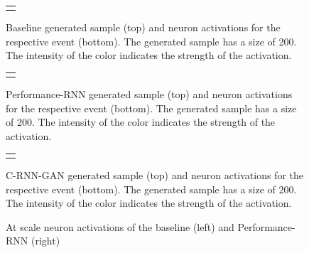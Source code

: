 \documentclass[a4paper]{book}
\begin{document}
    \newlength\heatheight
    \newlength\heatwidth
    \setlength\heatheight{9.5cm}
    \setlength\heatwidth{11.5cm}
\begin{figure}
        \begin{tabular}{c}
             \\
             \\
    \end{tabular}
    \caption{Baseline generated sample (top) and neuron activations for the respective event (bottom). The generated sample has a size of 200. The intensity of the color indicates the strength of the activation.}
    \label{fig:baseline_activations}
\end{figure}

\begin{figure}
        \begin{tabular}{c}
             \\
             \\
    \end{tabular}
    \caption{Performance-RNN generated sample (top) and neuron activations for the respective event (bottom). The generated sample has a size of 200. The intensity of the color indicates the strength of the activation.}
    \label{fig:performancernn_activations}
\end{figure}

\begin{figure}
        \begin{tabular}{c}
             \\
             \\
    \end{tabular}
    \caption{C-RNN-GAN generated sample (top) and neuron activations for the respective event (bottom). The generated sample has a size of 200. The intensity of the color indicates the strength of the activation.}
    \label{fig:crnngan_activations}
\end{figure}

\begin{figure}[t]
    \setlength\heatwidth{6.25cm}
    \begin{subfigure}[b]{0.5\linewidth}
        \setlength\heatheight{8cm}
        
    \end{subfigure}
    \begin{subfigure}[b]{0.5\linewidth}
        \setlength\heatheight{14.5cm}
        
    \end{subfigure}
    \caption{At scale neuron activations of the baseline (left) and Performance-RNN (right)}
    \label{fig:acts_scaled}
\end{figure}
\end{document}
